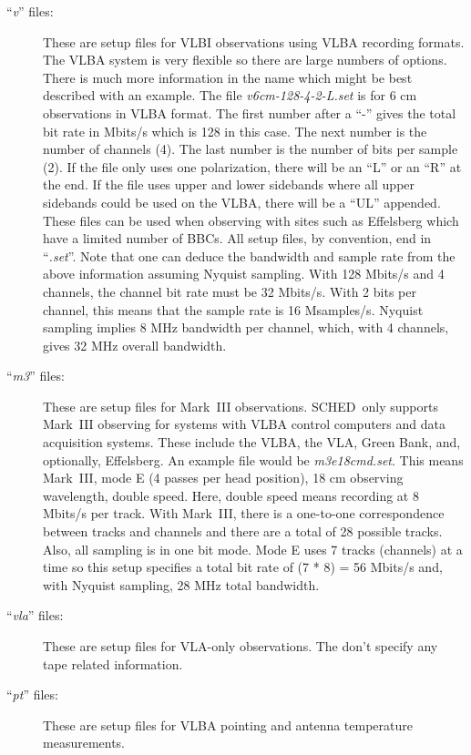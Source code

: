 \documentclass{report}
\newcommand{\schedb}{{\sc SCHED~}}
\begin{document}
\begin{description}

\item[``{\sl v}'' files:] These are setup files for VLBI observations
using VLBA recording formats.  The VLBA system is very flexible so
there are large numbers of options.  There is much more information in
the name which might be best described with an example.  The file {\sl
v6cm-128-4-2-L.set} is for 6 cm observations in VLBA format.  The
first number after a ``-'' gives the total bit rate in Mbits/s which
is 128 in this case.  The next number is the number of channels (4).
The last number is the number of bits per sample (2).  If the file
only uses one polarization, there will be an ``L'' or an ``R'' at the
end.  If the file uses upper and lower sidebands where all upper
sidebands could be used on the VLBA, there will be a ``UL'' appended.
These files can be used when observing with sites such as Effelsberg
which have a limited number of BBCs.  All setup files, by convention,
end in ``{\sl .set}''.  Note that one can deduce the bandwidth and
sample rate from the above information assuming Nyquist sampling.
With 128 Mbits/s and 4 channels, the channel bit rate must be 32
Mbits/s.  With 2 bits per channel, this means that the sample rate is
16 Msamples/s.  Nyquist sampling implies 8 MHz bandwidth per channel,
which, with 4 channels, gives 32 MHz overall bandwidth.

\item[``{\sl m3}'' files:] These are setup files for Mark~III
observations.  \schedb only supports Mark~III observing for
systems with VLBA control computers and data acquisition systems.
These include the VLBA, the VLA, Green Bank, and, optionally,
Effelsberg.  An example file would be {\sl m3e18cmd.set}.  This means
Mark~III, mode E (4 passes per head position), 18 cm observing
wavelength, double speed.  Here, double speed means recording at 8
Mbits/s per track.  With Mark~III, there is a one-to-one
correspondence between tracks and channels and there are a total of 28
possible tracks.  Also, all sampling is in one bit mode.  Mode E uses
7 tracks (channels) at a time so this setup specifies a total bit rate
of (7 * 8) = 56 Mbits/s and, with Nyquist sampling, 28
MHz total bandwidth.

\item[``{\sl vla}'' files:]  These are setup files for VLA-only
observations.  The don't specify any tape related information.

\item[``{\sl pt}'' files:] These are setup files for VLBA pointing and
antenna temperature measurements.


\end{description}
\end{document}
